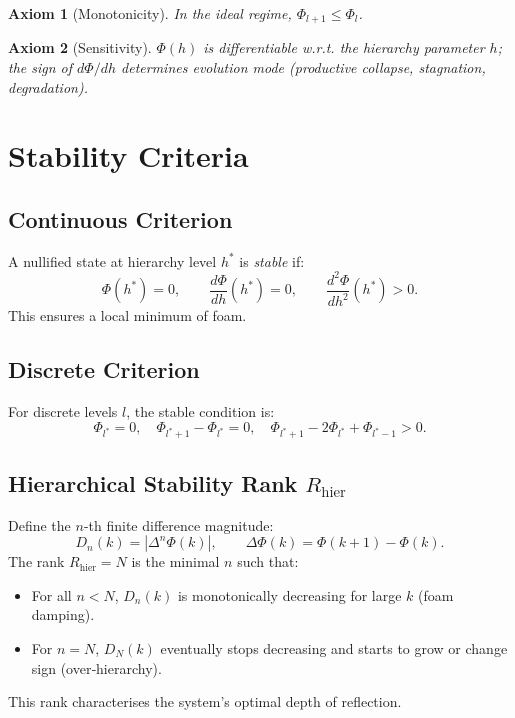 \documentclass[12pt,a4paper]{article}
\newtheorem{axiom}{Axiom}
\begin{document}
\begin{axiom}[Monotonicity]
In the ideal regime, $\Phi_{l+1} \le \Phi_l$.
\end{axiom}

\begin{axiom}[Sensitivity]
$\Phi(h)$ is differentiable w.r.t. the hierarchy parameter $h$; the sign of $d\Phi/dh$ determines evolution mode (productive collapse, stagnation, degradation).
\end{axiom}

\section{Stability Criteria}

\subsection{Continuous Criterion}
A nullified state at hierarchy level $h^*$ is \emph{stable} if:
\begin{equation}
\Phi(h^*) = 0,\qquad \frac{d\Phi}{dh}(h^*) = 0,\qquad \frac{d^2\Phi}{dh^2}(h^*) > 0.
\end{equation}
This ensures a local minimum of foam.

\subsection{Discrete Criterion}
For discrete levels $l$, the stable condition is:
\begin{equation}
\Phi_{l^*} = 0,\quad \Phi_{l^*+1} - \Phi_{l^*} = 0,\quad \Phi_{l^*+1} - 2\Phi_{l^*} + \Phi_{l^*-1} > 0.
\end{equation}

\subsection{Hierarchical Stability Rank $R_{\text{hier}}$}
Define the $n$-th finite difference magnitude:
\begin{equation}
D_n(k) = |\Delta^n \Phi(k)|,\qquad \Delta \Phi(k) = \Phi(k+1) - \Phi(k).
\end{equation}
The rank $R_{\text{hier}} = N$ is the minimal $n$ such that:
\begin{itemize}
\item For all $n < N$, $D_n(k)$ is monotonically decreasing for large $k$ (foam damping).
\item For $n = N$, $D_N(k)$ eventually stops decreasing and starts to grow or change sign (over‑hierarchy).
\end{itemize}
This rank characterises the system's optimal depth of reflection.
\end{document}
